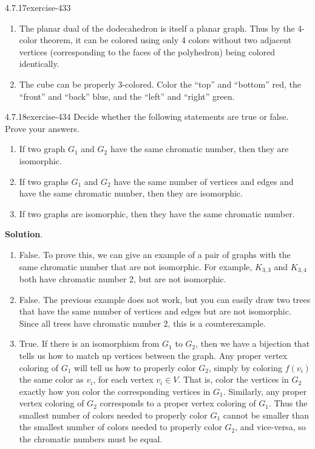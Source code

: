 \documentclass[twoside,11pt,]{book}
\numberwithin{equation}{chapter}
\begin{document}
\begin{divisionsolution}{4.7.17}{}{exercise-433}
\begin{enumerate}[label=(\alph*)]
\item\hypertarget{li-2392}{}\hypertarget{p-4978}{}%
The planar dual of the dodecahedron is itself a planar graph. Thus by the 4-color theorem, it can be colored using only 4 colors without two adjacent vertices (corresponding to the faces of the polyhedron) being colored identically.%
\item\hypertarget{li-2393}{}\hypertarget{p-4979}{}%
The cube can be properly 3-colored. Color the ``top'' and ``bottom'' red, the ``front'' and ``back'' blue, and the ``left'' and ``right'' green.%
\end{enumerate}
%
\end{divisionsolution}%
\begin{divisionsolution}{4.7.18}{}{exercise-434}%
\hypertarget{p-4980}{}%
Decide whether the following statements are true or false. Prove your answers.\leavevmode%
\begin{enumerate}[label=(\alph*)]
\item\hypertarget{li-2394}{}\hypertarget{p-4981}{}%
If two graph \(G_1\) and \(G_2\) have the same chromatic number, then they are isomorphic.%
\item\hypertarget{li-2395}{}\hypertarget{p-4982}{}%
If two graphs \(G_1\) and \(G_2\) have the same number of vertices and edges and have the same chromatic number, then they are isomorphic.%
\item\hypertarget{li-2396}{}\hypertarget{p-4983}{}%
If two graphs are isomorphic, then they have the same chromatic number.%
\end{enumerate}
%
\par\smallskip%
\noindent\textbf{Solution}.\quad%
\hypertarget{p-4984}{}%
\leavevmode%
\begin{enumerate}[label=(\alph*)]
\item\hypertarget{li-2397}{}\hypertarget{p-4985}{}%
False. To prove this, we can give an example of a pair of graphs with the same chromatic number that are not isomorphic. For example, \(K_{3,3}\) and \(K_{3,4}\) both have chromatic number 2, but are not isomorphic.%
\item\hypertarget{li-2398}{}\hypertarget{p-4986}{}%
False. The previous example does not work, but you can easily draw two trees that have the same number of vertices and edges but are not isomorphic. Since all trees have chromatic number 2, this is a counterexample.%
\item\hypertarget{li-2399}{}\hypertarget{p-4987}{}%
True. If there is an isomorphism from \(G_1\) to \(G_2\), then we have a bijection that tells us how to match up vertices between the graph. Any proper vertex coloring of \(G_1\) will tell us how to properly color \(G_2\), simply by coloring \(f(v_i)\) the same color as \(v_i\), for each vertex \(v_i \in V\). That is, color the vertices in \(G_2\) exactly how you color the corresponding vertices in \(G_1\). Similarly, any proper vertex coloring of \(G_2\) corresponds to a proper vertex coloring of \(G_1\). Thus the smallest number of colors needed to properly color \(G_1\) cannot be smaller than the smallest number of colors needed to properly color \(G_2\), and vice-versa, so the chromatic numbers must be equal.%

\end{enumerate}
\end{divisionsolution}
\end{document}
